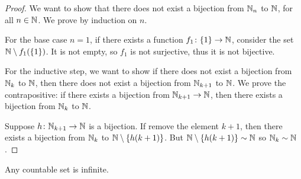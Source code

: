 \begin{proof}
We want to show that there does not exist a bijection from $\mathbb N_n$ to $\mathbb N$, for all $n\in\mathbb N$. We prove by induction on $n$.

For the base case $n=1$, if there exists a function $f_1\colon\{1\}\to\mathbb N$, consider the set $\mathbb N\setminus f_1(\{1\})$. It is not empty, so $f_1$ is not surjective, thus it is not bijective.

For the inductive step, we want to show if there does not exist a bijection from $\mathbb N_k$ to $\mathbb N$, then there does not exist a bijection from $\mathbb N_{k+1}$ to $\mathbb N$. We prove the contrapositive: if there exists a bijection from $\mathbb N_{k+1}\to\mathbb N$, then there exists a bijection from $\mathbb N_k$ to $\mathbb N$.

Suppose $h\colon\mathbb N_{k+1}\to\mathbb N$ is a bijection. If remove the element $k+1$, then there exists a bijection from $\mathbb N_k$ to $\mathbb N\setminus\{h(k+1)\}$. But $\mathbb N\setminus\{h(k+1)\}\sim\mathbb N$ so $\mathbb N_k\sim\mathbb N$.
\end{proof}

\begin{corollary}
Any countable set is infinite.
\end{corollary}

